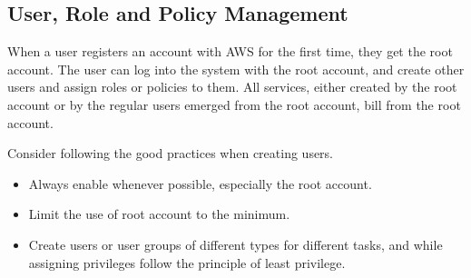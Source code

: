 \subsection{User, Role and Policy Management}

When a user registers an account with AWS for the first time, they get the root account. The user can log into the system with the root account, and create other users and assign roles or policies to them. All services, either created by the root account or by the regular users emerged from the root account, bill from the root account. 

Consider following the good practices when creating users.
\begin{itemize}
	\item Always enable  whenever possible, especially the root account.
	\item Limit the use of root account to the minimum.
	\item Create users or user groups of different types for different tasks, and while assigning privileges follow the principle of least privilege.
\end{itemize}

